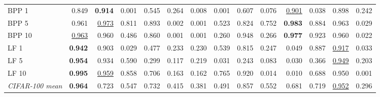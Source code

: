 \begin{table}[htbp]
\begin{adjustbox}{max width=\linewidth}
\begin{tabular}{lrrrrrrrrrrrrr}
BPP 1 & 0.849 & \textbf{0.914} & \textcolor{black!45}{0.001} & 0.545 & \textcolor{black!45}{0.264} & \textcolor{black!45}{0.008} & \textcolor{black!45}{0.001} & 0.607 & \textcolor{black!45}{0.076} & \underline{0.901} & \textcolor{black!45}{0.038} & 0.898 & \textcolor{black!45}{0.242} \\
BPP 5 & 0.961 & \underline{0.973} & 0.811 & 0.893 & \textcolor{black!45}{0.002} & \textcolor{black!45}{0.001} & 0.523 & 0.824 & 0.752 & \textbf{0.983} & 0.884 & 0.963 & \textcolor{black!45}{0.029} \\
BPP 10 & \underline{0.963} & 0.960 & \textcolor{black!45}{0.486} & 0.860 & \textcolor{black!45}{0.001} & \textcolor{black!45}{0.001} & \textcolor{black!45}{0.260} & 0.948 & \textcolor{black!45}{0.266} & \textbf{0.977} & 0.923 & 0.960 & \textcolor{black!45}{0.022} \\
LF 1 & \textbf{0.942} & 0.903 & \textcolor{black!45}{0.029} & \textcolor{black!45}{0.477} & \textcolor{black!45}{0.233} & \textcolor{black!45}{0.230} & 0.539 & 0.815 & \textcolor{black!45}{0.247} & \textcolor{black!45}{0.049} & 0.887 & \underline{0.917} & \textcolor{black!45}{0.033} \\
LF 5 & \textbf{0.954} & 0.934 & 0.590 & \textcolor{black!45}{0.299} & \textcolor{black!45}{0.117} & \textcolor{black!45}{0.219} & \textcolor{black!45}{0.031} & \textcolor{black!45}{0.243} & \textcolor{black!45}{0.083} & \textcolor{black!45}{0.030} & \textcolor{black!45}{0.366} & \underline{0.949} & \textcolor{black!45}{0.203} \\
LF 10 & \textbf{0.995} & \underline{0.959} & 0.858 & 0.706 & \textcolor{black!45}{0.163} & \textcolor{black!45}{0.162} & 0.765 & 0.920 & \textcolor{black!45}{0.014} & \textcolor{black!45}{0.010} & 0.688 & 0.950 & \textcolor{black!45}{0.001} \\
\rowcolor{black!8}\emph{CIFAR-100 mean} & \textbf{0.964} & 0.723 & 0.547 & 0.732 & \textcolor{black!45}{0.415} & \textcolor{black!45}{0.381} & \textcolor{black!45}{0.491} & 0.857 & 0.552 & 0.681 & 0.719 & \underline{0.952} & \textcolor{black!45}{0.296} \\
\bottomrule
\end{tabular}
\end{adjustbox}
\end{table}

